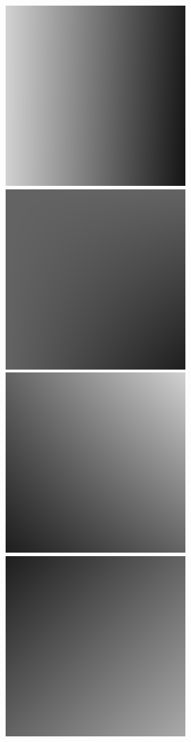 \documentclass{beamer}
\begin{document}
\begin{frame}
    \begin{columns}[c]
        \includegraphics[scale=0.15]{Interpolated5DimImage1.png} \hspace{0.3pt}
        \includegraphics[scale=0.15]{Interpolated5DimImage2.png} \hspace{0.3pt}
        \includegraphics[scale=0.15]{Interpolated5DimImage3.png} \\ \hspace{17pt}
        \includegraphics[scale=0.15]{Interpolated5DimImage4.png} \hspace{0.3pt}

\end{columns}
\end{frame}
\end{document}
